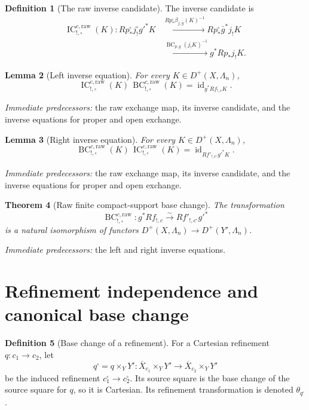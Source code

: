 \documentclass[10pt]{article}
\newtheorem{theorem}{Theorem}[section]
\newtheorem{lemma}[theorem]{Lemma}
\theoremstyle{definition}
\newtheorem{definition}[theorem]{Definition}
\newcommand{\pred}[1]{\par\smallskip\begingroup\footnotesize\raggedright
\emph{Immediate predecessors:} #1.\par\endgroup}
\begin{document}
\begin{definition}[The raw inverse candidate]
The inverse candidate is
\[
\begin{aligned}
 \operatorname{IC}^{c,\mathrm{raw}}_{!,\square}(K):
 Rp^\square_*j^\square_!g'^*K
 &\xrightarrow{Rp^\square_*\beta_{j,\bar g}(K)^{-1}}
 Rp^\square_*\bar g^*j_!K\\
 &\xrightarrow{\operatorname{BC}_{p,g}(j_!K)^{-1}}
 g^*Rp_*j_!K.
\end{aligned}
\]
\end{definition}

\begin{lemma}[Left inverse equation]
For every \(K\in D^+(X,\Lambda_n)\),
\[
 \operatorname{IC}^{c,\mathrm{raw}}_{!,\square}(K)\,
 \operatorname{BC}^{c,\mathrm{raw}}_{!,\square}(K)
 =\operatorname{id}_{g^*Rf_{!,c}K}.
\]
\end{lemma}
\pred{the raw exchange map, its inverse candidate, and the inverse equations for proper and open exchange}

\begin{lemma}[Right inverse equation]
For every \(K\in D^+(X,\Lambda_n)\),
\[
 \operatorname{BC}^{c,\mathrm{raw}}_{!,\square}(K)\,
 \operatorname{IC}^{c,\mathrm{raw}}_{!,\square}(K)
 =\operatorname{id}_{Rf'_{!,c^\square}g'^*K}.
\]
\end{lemma}
\pred{the raw exchange map, its inverse candidate, and the inverse equations for proper and open exchange}

\begin{theorem}[Raw finite compact-support base change]
The transformation
\[
 \operatorname{BC}^{c,\mathrm{raw}}_{!,\square}:
 g^*Rf_{!,c}\xrightarrow{\sim}Rf'_{!,c^\square}g'^*
\]
is a natural isomorphism of functors
\(D^+(X,\Lambda_n)\to D^+(Y',\Lambda_n)\).
\end{theorem}
\pred{the left and right inverse equations}

\section{Refinement independence and canonical base change}

\begin{definition}[Base change of a refinement]
For a Cartesian refinement \(q:c_1\to c_2\), let
\[
 q^\square=q\times_YY':
 \overline X_{c_1}\times_YY'\longrightarrow
 \overline X_{c_2}\times_YY'
\]
be the induced refinement \(c^\square_1\to c^\square_2\).  Its source
square is the base change of the source square for \(q\), so it is
Cartesian.  Its refinement transformation is denoted
\(\theta_{q^\square}\).
\end{definition}
\end{document}
